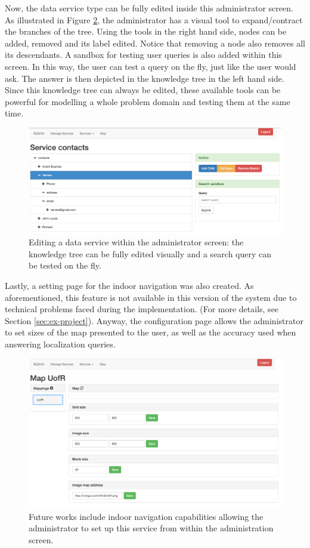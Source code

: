Now, the data service type can be fully edited inside this administrator screen.
As illustrated in Figure \ref{fig:sys_serv}, the administrator has a visual tool to expand/contract the branches of the tree.
Using the tools in the right hand side, nodes can be added, removed and its label edited.
Notice that removing a node also removes all its descendants.
A sandbox for testing user queries is also added within this screen.
In this way, the user can test a query on the fly, just like the user would ask.
The answer is then depicted in the knowledge tree in the left hand side.
Since this knowledge tree can always be edited, these available tools can be powerful for modelling a whole problem domain and testing them at the same time.

\begin{figure}[htbp]
\begin{center}
\includegraphics[width=\textwidth]{figures/services.png}
\caption{Editing a data service within the administrator screen: the knowledge tree can be fully edited visually and a search query can be tested on the fly.}
\label{fig:sys_serv}
\end{center}
\end{figure}

Lastly, a setting page for the indoor navigation was also created.
As aforementioned, this feature is not available in this version of the system due to technical problems faced during the implementation.
(For more details, see Section \ref{sec:ex-project}).
Anyway, the configuration page allows the administrator to set sizes of the map presented to the user, as well as the accuracy used when answering localization queries.

\begin{figure}[htbp]
\begin{center}
\includegraphics[width=\textwidth]{figures/map.png}
\caption{Future works include indoor navigation capabilities allowing the administrator to set up this service from within the administration screen.}
\label{fig:sys_serv}
\end{center}
\end{figure}
